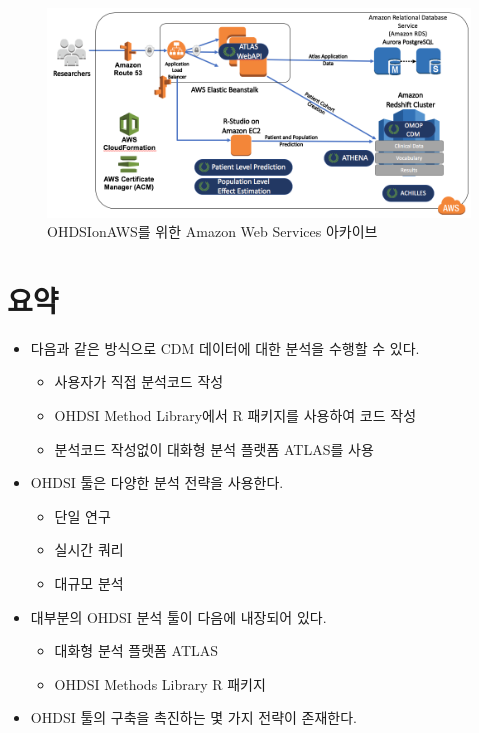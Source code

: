 \documentclass[11pt]{book}
\providecommand{\tightlist}{%
  \setlength{\itemsep}{0pt}\setlength{\parskip}{0pt}}
\theoremstyle{definition}
\theoremstyle{definition}
\theoremstyle{definition}
\theoremstyle{remark}
\let\BeginKnitrBlock\begin \let\EndKnitrBlock\end
\begin{document}
\begin{figure}

{\centering \includegraphics[width=1\linewidth]{images/OhdsiAnalyticsTools/OHDSIonAWSDiagram} 

}

\caption{OHDSIonAWS를 위한 Amazon Web Services 아카이브}\label{fig:ohdsionawsDiagram}
\end{figure}

\section{요약}\label{-6}

\BeginKnitrBlock{rmdsummary}
\begin{itemize}
\tightlist
\item
  다음과 같은 방식으로 CDM 데이터에 대한 분석을 수행할 수 있다.

  \begin{itemize}
  \tightlist
  \item
    사용자가 직접 분석코드 작성
  \item
    OHDSI Method Library에서 R 패키지를 사용하여 코드 작성
  \item
    분석코드 작성없이 대화형 분석 플랫폼 ATLAS를 사용
  \end{itemize}
\item
  OHDSI 툴은 다양한 분석 전략을 사용한다.

  \begin{itemize}
  \tightlist
  \item
    단일 연구
  \item
    실시간 쿼리
  \item
    대규모 분석
  \end{itemize}
\item
  대부분의 OHDSI 분석 툴이 다음에 내장되어 있다.

  \begin{itemize}
  \tightlist
  \item
    대화형 분석 플랫폼 ATLAS
  \item
    OHDSI Methods Library R 패키지
  \end{itemize}
\item
  OHDSI 툴의 구축을 촉진하는 몇 가지 전략이 존재한다.
\end{itemize}
\EndKnitrBlock{rmdsummary}
\end{document}
